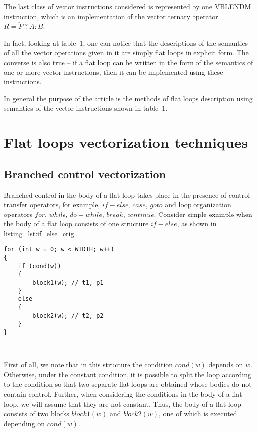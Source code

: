\documentclass[
11pt,%
tightenlines,%
twoside,%
onecolumn,%
nofloats,%
nobibnotes,%
nofootinbib,%
superscriptaddress,%
noshowpacs,%
centertags]%
{revtex4}
\begin{document}
The last class of vector instructions considered is represented by one VBLENDM instruction, which is an implementation of the vector ternary operator $R = \check{P} \ ? \ A : B$.

In fact, looking at table~1, one can notice that the descriptions of the semantics of all the vector operations given in it are simply flat loops in explicit form.
The converse is also true -- if a flat loop can be written in the form of the semantics of one or more vector instructions, then it can be implemented using these instructions.

In general the purpose of the article is the methods of flat loops description using semantics of the vector instructions shown in table~1.

\section{Flat loops vectorization techniques}

\subsection{Branched control vectorization}

Branched control in the body of a flat loop takes place in the presence of control transfer operators, for example, $if-else$, $case$, $goto$ and loop organization operators $for$, $while$, $do-while$, $break$, $continue$.
Consider simple example when the body of a flat loop consists of one structure $if-else$, as shown in listing~\ref{lst:if_else_orig}.

\begin{lstlisting}[caption={The body of a flat loop, consisting of $if-else$ structure.},label={lst:if_else_orig}]
for (int w = 0; w < WIDTH; w++)
{
    if (cond(w))
    {
        block1(w); // t1, p1
    }
    else
    {
        block2(w); // t2, p2
    }
}
\end{lstlisting}

\

First of all, we note that in this structure the condition $cond(w)$ depends on $w$.
Otherwise, under the constant condition, it is possible to split the loop according to the condition so that two separate flat loops are obtained whose bodies do not contain control.
Further, when considering the conditions in the body of a flat loop, we will assume that they are not constant.
Thus, the body of a flat loop consists of two blocks $block1(w)$ and $block2(w)$, one of which is executed depending on $cond(w)$.
\end{document}
